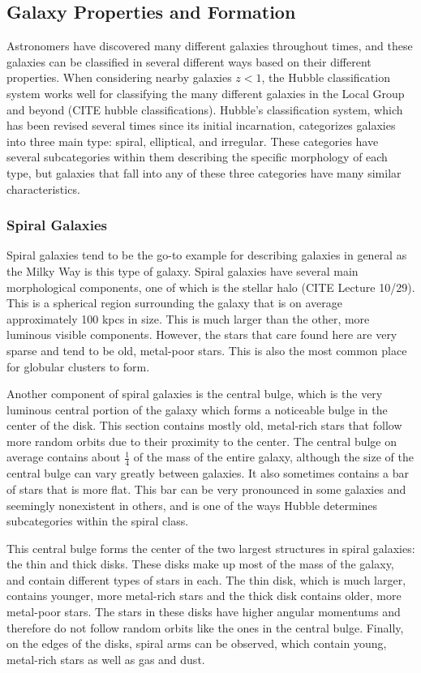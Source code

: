 \documentclass[12pt]{article}
\begin{document}
\subsection{Galaxy Properties and Formation}
Astronomers have discovered many different galaxies throughout times, and these
galaxies can be classified in several different ways based on their different
properties.  When considering nearby galaxies $z < 1$, the Hubble
classification system works well for classifying the many different galaxies in
the Local Group and beyond (CITE hubble classifications).  Hubble's
classification system, which has been revised several times since its initial
incarnation, categorizes galaxies into three main type: spiral, elliptical, and
irregular.  These categories have several subcategories within them describing
the specific morphology of each type, but galaxies that fall into any of these
three categories have many similar characteristics.

    \subsubsection{Spiral Galaxies}
    Spiral galaxies tend to be the go-to example for describing galaxies in general
    as the Milky Way is this type of galaxy.  Spiral galaxies have several main
    morphological components, one of which is the stellar halo (CITE Lecture 10/29).
    This is a spherical region surrounding the galaxy that is on average
    approximately 100 kpcs in size.  This is much larger than the other, more
    luminous visible components.  However, the stars that care found here are very
    sparse and tend to be old, metal-poor stars.  This is also the most common place
    for globular clusters to form.

    Another component of spiral galaxies is the central bulge, which is the very
    luminous central portion of the galaxy which forms a noticeable bulge in the
    center of the disk.  This section contains mostly old, metal-rich stars that
    follow more random orbits due to their proximity to the center.  The central
    bulge on average contains about $\frac{1}{4}$ of the mass of the entire
    galaxy, although the size of the central bulge can vary greatly between
    galaxies.  It also sometimes contains a bar of stars that is more flat.
    This bar can be very pronounced in some galaxies and seemingly nonexistent
    in others, and is one of the ways Hubble determines subcategories within the
    spiral class.

    This central bulge forms the center of the two largest structures in spiral
    galaxies: the thin and thick disks.  These disks make up most of the mass of
    the galaxy, and contain different types of stars in each.  The thin disk,
    which is much larger, contains younger, more metal-rich stars and the thick
    disk contains older, more metal-poor stars.  The stars in these disks have
    higher angular momentums and therefore do not follow random orbits like the
    ones in the central bulge.  Finally, on the edges of the disks, spiral arms
    can be observed, which contain young, metal-rich stars as well as gas and
    dust.
\end{document}
